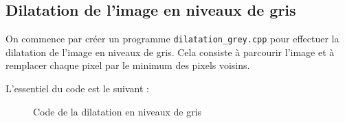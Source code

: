 \documentclass[french,a4paper,10pt]{article}
\begin{document}
	\newpage
	\subsection{Dilatation de l'image en niveaux de gris}\label{subsec:5.2}

	On commence par créer un programme \texttt{dilatation\_grey.cpp} pour effectuer la dilatation de l'image en niveaux
	de gris.
	Cela consiste à parcourir l'image et à remplacer chaque pixel par le minimum des pixels voisins.

	L'essentiel du code est le suivant : %
	\begin{figure}[!htb]
		\centering
		\caption{Code de la dilatation en niveaux de gris}\label{Fig:dilatation-grey-code}
	\end{figure}
\end{document}
